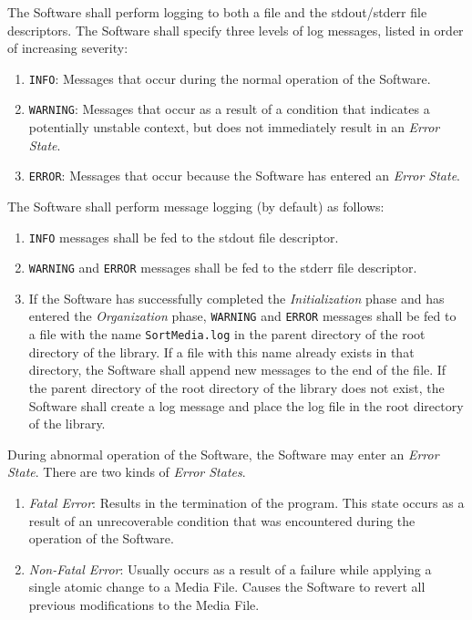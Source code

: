 \documentclass{designdoc}
\begin{document}
The Software shall perform logging to both a file and the stdout/stderr file
descriptors. The Software shall specify three levels of log messages, listed
in order of increasing severity:
\begin{enumerate}
\item \texttt{INFO}: Messages that occur during the normal operation of the
  Software.
\item \texttt{WARNING}: Messages that occur as a result of a condition that
  indicates a potentially unstable context, but does not immediately result
  in an \textit{Error State}.
\item \texttt{ERROR}: Messages that occur because the Software has entered an
  \textit{Error State}.
\end{enumerate}
The Software shall perform message logging (by default) as follows:
\begin{enumerate}
\item \texttt{INFO} messages shall be fed to the stdout file descriptor.
\item \texttt{WARNING} and \texttt{ERROR} messages shall be fed to the stderr
  file descriptor.
\item If the Software has successfully completed the \textit{Initialization}
  phase and has entered the \textit{Organization} phase, \texttt{WARNING} and
  \texttt{ERROR} messages shall be fed to a file with the name
  \texttt{SortMedia.log} in the parent directory of the root directory of the
  library. If a file with this name already exists in that directory, the
  Software shall append new messages to the end of the file. If the parent
  directory of the root directory of the library does not exist, the Software
  shall create a log message and place the log file in the root directory of
  the library.
\end{enumerate}

During abnormal operation of the Software, the Software may enter an
\textit{Error State}. There are two kinds of \textit{Error States}.
\begin{enumerate}
\item \textit{Fatal Error}: Results in the termination of the program. This
  state occurs as a result of an unrecoverable condition that was encountered
  during the operation of the Software.
\item \textit{Non-Fatal Error}: Usually occurs as a result of a failure while
  applying a single atomic change to a Media File. Causes the Software to
  revert all previous modifications to the Media File.
\end{enumerate}
\end{document}
